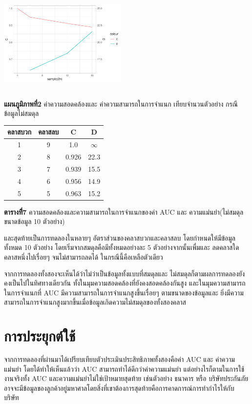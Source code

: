 \documentclass[twoside, twocolumn, 12pt]{article}
\begin{document}
\includegraphics[height=2in,width=2.5in]{Rplot02.pdf}
\begin{center} \textbf{แผนภูมิภาพที่2} ค่าความสอดคล้องและ ค่าความสามารถในการจำแนก เทียบจำนวนตัวอย่าง กรณีข้อมูลไม่สมดุล\end{center}

\begin{center}
\begin{tabular}{cccc}
\hline
คลาสบวก & คลาสลบ & C & D\\
\hline
1&9&1.0 &$\infty$\\\hline
2&8&0.926&22.3\\\hline
3&7&0.939&15.5\\\hline
4&6&0.956&14.9\\\hline
5&5&0.963&15.2\\\hline
\end{tabular}
\end{center}
\begin{center} \textbf{ตารางที่ึ7} ความสอดคล้องและความสามารถในการจำแนกของค่า AUC และ ความแม่นยำ(ไม่สมดุล ขนาดข้อมูล 10 ตัวอย่าง) \end{center}

และสุดท้ายเป็นการทดลองในหลายๆ อัตราส่วนของคลาสบวกและคลาสลบ โดยกำหนดให้มีข้อมูลทั้งหมด 10 ตัวอย่าง โดยเริ่มจากสมดุลคือมีทั้งหมดอย่างละ 5 ตัวอย่างจากนั้นเพื่มและ ลดคลาสใดคลาสหนึ่งไปเรื่อยๆ จนไม่สามารถลดได้ ในกรณีนี้คือเหลือตัวเดียว

จากการทดลองทั้งสองจะเห็นได้ว่าไม่ว่าเป็นข้อมูลทั้งแบบที่สมดุลและ ไม่สมดุลก็ตามผลการทดลองยังคงเป็นไปในทิศทางเดียวกัน ทั้งในมุมความสอดคล้องที่ยังคงสอดคล้องกันสูง และในมุมความสามารถในการจำแนกที่ AUC มีความสามารถในการจำแนกสูงขึ้นเรื่อยๆ ตามขนาดของข้อมูลและ ยิ่งมีความสามารถในการจำแนกสูงมากขึ้นเมื่อข้อมูลเกิดความไม่สมดุลของทั้งสองคลาส


\section{การประยุกต์ใช้}
\quad จากการทดลองที่ผ่านมาได้เปรียบเทียบตัวประเมินประสิทธิภาพทั้งสองคือค่า AUC และ ค่าความแม่นยำ โดยได้ทำให้เห็นแล้วว่า AUC สามารถทำได้ดีกว่าค่าความแม่นยำ แต่อย่างไรก็ตามในการใช้งานจริงทั้ง AUC และความแม่นยำไม่ใช่เป้าหมายสุดท้าย เช่นตัวอย่าง ธนาคาร หรือ บริษัทประกันภัย อาจจะมีข้อมูลของลูกค้าอยู่มหาศาลโดยสิ่งที่เขาต้องการสุดท้ายคือการคาดการณ์การทำกำไรให้กับ บริษัท
\end{document}
